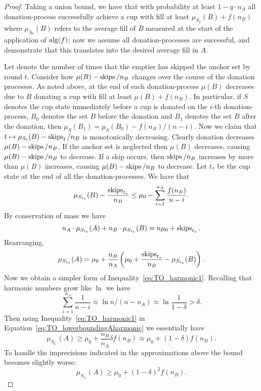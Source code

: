 \begin{proof}
  Taking a union bound, we have that with probability at least
  $1- q \cdot n_A$ all donation-process successfully achieve a cup
  with fill at least $\mu_{S_0}(B) + f(n_B)$ where $\mu_{S_0}(B)$
  refers to the average fill of $B$ measured at the start of the
  application of $\operatorname{\text{\textup{alg}}}(f)$; now we assume all donation-processes
  are successful, and demonstrate that this translates into the
  desired average fill in $A$.

  Let  denote the number of times that the
  emptier has skipped the anchor set by round $t$. Consider how
  $\mu(B) - \operatorname{\text{\textup{skips}}}/n_B$ changes over the course of the donation
  processes. As noted above, at the end of each donation-process
  $\mu(B)$ decreases due to $B$ donating a cup with fill at least
  $\mu(B) + f(n_B)$. In particular, if $S$ denotes the cup state
  immediately before a cup is donated on the $i$-th
  donation-process, $B_0$ denotes the set $B$ before
  the donation and $B_1$ denotes the set $B$ after the donation,
  then $\mu_{S}(B_1) = \mu_{S}(B_0) - f(n_B) / (n-i)$. Now we claim that
  $t\mapsto \mu_{S_t}(B) - \operatorname{\text{\textup{skips}}}_t/n_B$ is monotonically decreasing. 
  Clearly donation decreases $\mu(B) - \operatorname{\text{\textup{skips}}}/n_B$. 
  If the anchor set is neglected then $\mu(B)$ decreases, causing
  $\mu(B) - \operatorname{\text{\textup{skips}}}/n_B$ to decrease. 
  If a skip occurs, then $\operatorname{\text{\textup{skips}}}/n_B$ increases by more than
  $\mu(B)$ increases, causing $\mu(B)-\operatorname{\text{\textup{skips}}}/n_B$ to decrease. 
  Let $t_*$ be the cup state at the end of all the
  donation-processes. We have that 
  \begin{equation}
    \label{eq:TO_harmonic1}
    \mu_{S_{t_*}}(B) - \frac{\operatorname{\text{\textup{skips}}}_{t_*}}{n_B} \le \mu_0 - \sum_{i=1}^{n_A}\frac{f(n_B)}{n-i}.
  \end{equation}
  By conservation of mass we have 
  $$n_A\cdot \mu_{S_{t_*}}(A) + n_B\cdot \mu_{S_{t_*}}(B) = n\mu_0 + \operatorname{\text{\textup{skips}}}_{t_*}.$$
  Rearranging, 
  \begin{equation}
    \label{eq:TO_lowerboundingAharmonic}
    \mu_{S_{t_*}}(A) = \mu_0 + \frac{n_B}{n_A}\left( \mu_0 +
    \frac{\operatorname{\text{\textup{skips}}}_{t_*}}{n_B} - \mu_{S_{t_*}}(B) \right).
  \end{equation}
  Now we obtain a simpler form of
  Inequality~\eqref{eq:TO_harmonic1}. Recalling that harmonic
  numbers grow like $\ln$ we have
  $$\sum_{i=1}^{n_A} \frac{1}{n-i} \approx \ln n/(n-n_A) \approx
  \ln \frac{1}{1-\delta} > \delta.$$
  Then using Inequality~\eqref{eq:TO_harmonic1} in
  Equation~\ref{eq:TO_lowerboundingAharmonic} we essentially have
  $$\mu_{S_{t_*}}(A) \ge \mu_0 + \frac{n_B}{n_A} \delta f(n_B)
  \approx \mu_0 + (1-\delta) f(n_B).$$
  To handle the imprecisions indicated in the
  approximations above the bound becomes slightly worse:
  $$\mu_{S_{t_*}}(A) \ge \mu_0 + (1-\delta)^2 f(n_B).$$


\end{proof}
